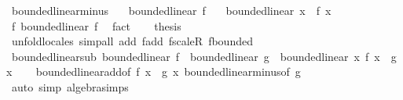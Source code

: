 \begin{isabellebody}
\isamarkupfalse%
%
\endisatagproof
{\isafoldproof}%
%
\isadelimproof
\isanewline
%
\endisadelimproof
\isanewline
{}\isamarkupfalse%
\ bounded{\isacharunderscore}{\kern0pt}linear{\isacharunderscore}{\kern0pt}minus{\isacharcolon}{\kern0pt}\isanewline
\ \ \ {\isachardoublequoteopen}bounded{\isacharunderscore}{\kern0pt}linear\ f{\isachardoublequoteclose}\isanewline
\ \ \ {\isachardoublequoteopen}bounded{\isacharunderscore}{\kern0pt}linear\ {\isacharparenleft}{\kern0pt}{\isasymlambda}x{\isachardot}{\kern0pt}\ {\isacharminus}{\kern0pt}\ f\ x{\isacharparenright}{\kern0pt}{\isachardoublequoteclose}\isanewline
%
\isadelimproof
%
\endisadelimproof
%
\isatagproof
{}\isamarkupfalse%
\ {\isacharminus}{\kern0pt}\isanewline
\ \ \isamarkupfalse%
\ f{\isacharcolon}{\kern0pt}\ bounded{\isacharunderscore}{\kern0pt}linear\ f\ \isamarkupfalse%
\ fact\isanewline
\ \ \isamarkupfalse%
\ {\isacharquery}{\kern0pt}thesis\isanewline
\ \ \ \ \isamarkupfalse%
\ unfold{\isacharunderscore}{\kern0pt}locales\ {\isacharparenleft}{\kern0pt}simp{\isacharunderscore}{\kern0pt}all\ add{\isacharcolon}{\kern0pt}\ f{\isachardot}{\kern0pt}add\ f{\isachardot}{\kern0pt}scaleR\ f{\isachardot}{\kern0pt}bounded{\isacharparenright}{\kern0pt}\isanewline
{}\isamarkupfalse%
%
\endisatagproof
{\isafoldproof}%
%
\isadelimproof
\isanewline
%
\endisadelimproof
\isanewline
{}\isamarkupfalse%
\ bounded{\isacharunderscore}{\kern0pt}linear{\isacharunderscore}{\kern0pt}sub{\isacharcolon}{\kern0pt}\ {\isachardoublequoteopen}bounded{\isacharunderscore}{\kern0pt}linear\ f\ {\isasymLongrightarrow}\ bounded{\isacharunderscore}{\kern0pt}linear\ g\ {\isasymLongrightarrow}\ bounded{\isacharunderscore}{\kern0pt}linear\ {\isacharparenleft}{\kern0pt}{\isasymlambda}x{\isachardot}{\kern0pt}\ f\ x\ {\isacharminus}{\kern0pt}\ g\ x{\isacharparenright}{\kern0pt}{\isachardoublequoteclose}\isanewline
%
\isadelimproof
\ \ %
\endisadelimproof
%
\isatagproof
{}\isamarkupfalse%
\ bounded{\isacharunderscore}{\kern0pt}linear{\isacharunderscore}{\kern0pt}add{\isacharbrackleft}{\kern0pt}of\ f\ {\isachardoublequoteopen}{\isasymlambda}x{\isachardot}{\kern0pt}\ {\isacharminus}{\kern0pt}\ g\ x{\isachardoublequoteclose}{\isacharbrackright}{\kern0pt}\ bounded{\isacharunderscore}{\kern0pt}linear{\isacharunderscore}{\kern0pt}minus{\isacharbrackleft}{\kern0pt}of\ g{\isacharbrackright}{\kern0pt}\isanewline
\ \ \isamarkupfalse%
\ {\isacharparenleft}{\kern0pt}auto\ simp{\isacharcolon}{\kern0pt}\ algebra{\isacharunderscore}{\kern0pt}simps{\isacharparenright}{\kern0pt}%

\end{isabellebody}
